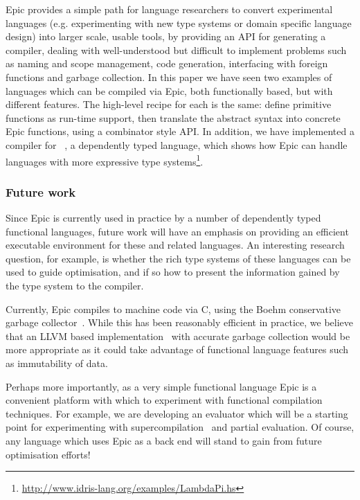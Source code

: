 Epic provides a simple path for language researchers to convert
experimental languages (e.g. experimenting with new type systems or
domain specific language design) into larger scale, usable tools, by
providing an API for generating a compiler, dealing with
well-understood but difficult to implement problems such as 
naming and scope management,
code generation, interfacing with foreign functions and
garbage collection. 
In this paper we have seen two examples of languages which can be
compiled via Epic, both functionally based, but with different
features. The high-level recipe for each is the same: define primitive
functions as run-time support, then translate the abstract syntax into
concrete Epic functions, using a combinator style API.  In addition,
we have implemented a compiler for \LamPi{}~\cite{simply-easy}, a
dependently typed language, which shows how Epic can handle languages
with more expressive type
systems\footnote{\url{http://www.idris-lang.org/examples/LambdaPi.hs}}.


\subsubsection{Future work}


Since Epic is currently used in practice by a number of dependently
typed functional languages, future work will have an emphasis on
providing an efficient executable environment for these and related
languages. An interesting research question, for example, is whether
the rich type systems of these languages can be used to guide
optimisation, and if so how to present the information gained by the
type system to the compiler.

Currently, Epic compiles to machine code via C, using the Boehm
conservative garbage collector~\cite{boehm-gc}. While this has been
reasonably efficient in practice, we believe that an LLVM based
implementation~\cite{llvm,llvm-haskell} with accurate garbage
collection would be more appropriate as it could take advantage of
functional language features such as immutability of data. 

Perhaps more importantly, as a very simple functional language Epic is
a convenient platform with which to experiment with functional
compilation techniques. For example, we are developing an evaluator
which will be a starting point for experimenting with
supercompilation~\cite{mitchell-super} and partial evaluation.
Of course, any language which uses Epic as a back end will stand to
gain from future optimisation efforts!
